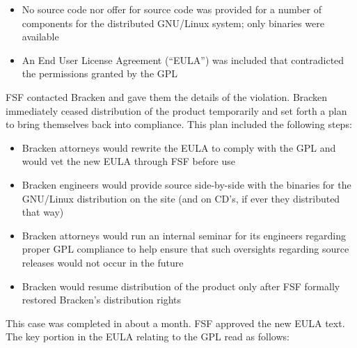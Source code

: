 \begin{itemize}

\item No source code nor offer for source code was provided for a number
  of components for the distributed GNU/Linux system; only binaries were
  available

\item An End User License Agreement (``EULA'') was included that
  contradicted the permissions granted by the GPL\@

\end{itemize}

FSF contacted Bracken and gave them the details of the violation. Bracken
immediately ceased distribution of the product temporarily and set forth
a plan to bring themselves back into compliance. This plan included the
following steps:

\begin{itemize}

\item Bracken attorneys would rewrite the EULA to comply with the GPL and
  would vet the new EULA through FSF before use

\item Bracken engineers would provide source side-by-side with the
  binaries for the GNU/Linux distribution on the site (and on CD's, if
  ever they distributed that way)

\item Bracken attorneys would run an internal seminar for its engineers
  regarding proper GPL compliance to help ensure that such oversights
  regarding source releases would not occur in the future

\item Bracken would resume distribution of the product only after FSF
  formally restored Bracken's distribution rights
\end{itemize}

This case was completed in about a month. FSF approved the new EULA
text. The key portion in the EULA relating to the GPL read as follows:

